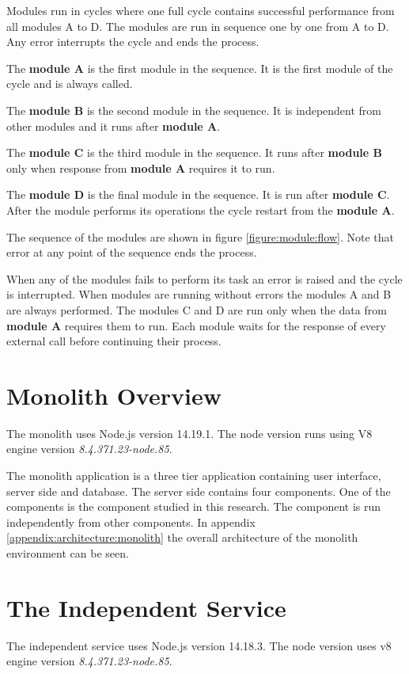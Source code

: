 Modules run in cycles where one full cycle contains successful performance from all modules A to D.
The modules are run in sequence one by one from A to D.
Any error interrupts the cycle and ends the process.

The \textbf{module A} is the first module in the sequence.
It is the first module of the cycle and is always called.

The \textbf{module B} is the second module in the sequence.
It is independent from other modules and it runs after \textbf{module A}.

The \textbf{module C} is the third module in the sequence.
It runs after \textbf{module B} only when response from \textbf{module A} requires it to run.

The \textbf{module D} is the final module in the sequence.
It is run after \textbf{module C}.
After the module performs its operations the cycle restart from the \textbf{module A}.

The sequence of the modules are shown in figure \ref{figure:module:flow}.
Note that error at any point of the sequence ends the process.

When any of the modules fails to perform its task an error is raised and the cycle is interrupted.
When modules are running without errors the modules A and B are always performed. 
The modules C and D are run only when the data from \textbf{module A} requires them to run.
Each module waits for the response of every external call before continuing their process.

\section{Monolith Overview}
The monolith uses Node.js version 14.19.1. The node version runs using V8 engine version \textit{8.4.371.23-node.85}.

The monolith application is a three tier application containing user interface, server side and database.
The server side contains four components.
One of the components is the component studied in this research.
The component is run independently from other components.
In appendix \ref{appendix:architecture:monolith} the overall architecture of the monolith environment can be seen.

\section{The Independent Service}
The independent service uses Node.js version 14.18.3.
The node version uses v8 engine version \textit{8.4.371.23-node.85}.

